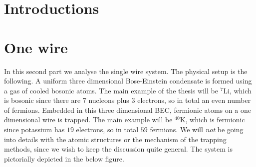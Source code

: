 \documentclass[11pt, twoside]{Thesis}
\begin{document}



\tableofcontents %




\mainmatter %

\pagestyle{fancy} %



\part{Introductions}
\newpage


 

\part{One wire}
In this second part we analyse the single wire system. The physical setup is the following. A uniform three dimensional Bose-Einstein condensate is formed using a gas of cooled bosonic atoms. The main example of the thesis will be $^{7}\text{Li}$, which is bosonic since there are $7$ nucleons plus $3$ electrons, so in total an even number of fermions. Embedded in this three dimensional BEC, fermionic atoms on a one dimensional wire is trapped. The main example will be $^{40}\text{K}$, which is fermionic since potassium has $19$ electrons, so in total $59$ fermions. We will \textit{not} be going into details with the atomic structures or the mechanism of the trapping methods, since we wish to keep the discussion quite general. The system is pictorially depicted in the below figure.
\end{document}
